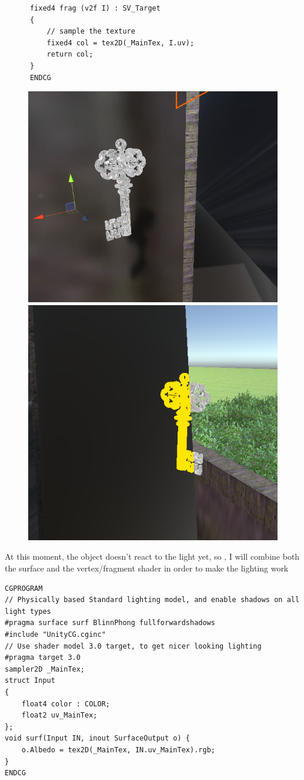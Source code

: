 \documentclass[a4paper, 13pt]{extarticle}
\begin{document}
{\begin{lstlisting}
      fixed4 frag (v2f I) : SV_Target
      {
	      // sample the texture
	      fixed4 col = tex2D(_MainTex, I.uv);
	      return col;
      }
      ENDCG
\end{lstlisting}
\begin{figure}[h]
	\begin{minipage}{.4\textwidth}
		\centering
		\includegraphics[width=0.7\linewidth]{intructions/key_with.png}
		\centering
	\end{minipage}
	\begin{minipage}{.45\textwidth}
		\centering
		\includegraphics[width=0.6\linewidth]{intructions/key_with2.png}
		\centering
	\end{minipage}
\end{figure}
At this moment, the object doesn't react to the light yet, so , I will combine both the surface and the vertex/fragment shader in order to make the lighting work

\begin{lstlisting}
CGPROGRAM
// Physically based Standard lighting model, and enable shadows on all light types
#pragma surface surf BlinnPhong fullforwardshadows
#include "UnityCG.cginc"
// Use shader model 3.0 target, to get nicer looking lighting
#pragma target 3.0
sampler2D _MainTex;
struct Input
{
	float4 color : COLOR;
	float2 uv_MainTex;
};
void surf(Input IN, inout SurfaceOutput o) {
	o.Albedo = tex2D(_MainTex, IN.uv_MainTex).rgb;
}
ENDCG
\end{lstlisting}
\newpage
~
	 \begin{figure}[h]
	

\end{figure}}
\end{document}
